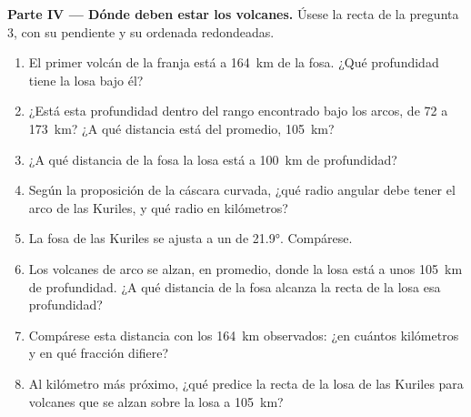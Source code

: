 \begin{problem}
\medskip
\noindent\textbf{Parte IV --- Dónde deben estar los volcanes.} Úsese la recta de la pregunta 3, con su pendiente y su ordenada redondeadas.
\begin{enumerate}[resume]
  \item El primer volcán de la franja está a \qty{164}{km} de la fosa. ¿Qué profundidad tiene la losa bajo él?
  \item ¿Está esta profundidad dentro del rango encontrado bajo los arcos, de 72 a \qty{173}{km}? ¿A qué distancia está del promedio, \qty{105}{km}?
  \item ¿A qué distancia de la fosa la losa está a \qty{100}{km} de profundidad?
  \item Según la proposición de la cáscara curvada, ¿qué radio angular debe tener el arco de las Kuriles, y qué radio en kilómetros?
  \item La fosa de las Kuriles se ajusta a un  de \ang{21.9}. Compárese.
  \item Los volcanes de arco se alzan, en promedio, donde la losa está a unos \qty{105}{km} de profundidad. ¿A qué distancia de la fosa alcanza la
        recta de la losa esa profundidad?
  \item Compárese esta distancia con los \qty{164}{km} observados: ¿en cuántos kilómetros y en qué fracción difiere?
  \item Al kilómetro más próximo, ¿qué  predice la recta de la losa de las Kuriles para volcanes que se alzan sobre la losa a \qty{105}{km}?
\end{enumerate}
\end{problem}
